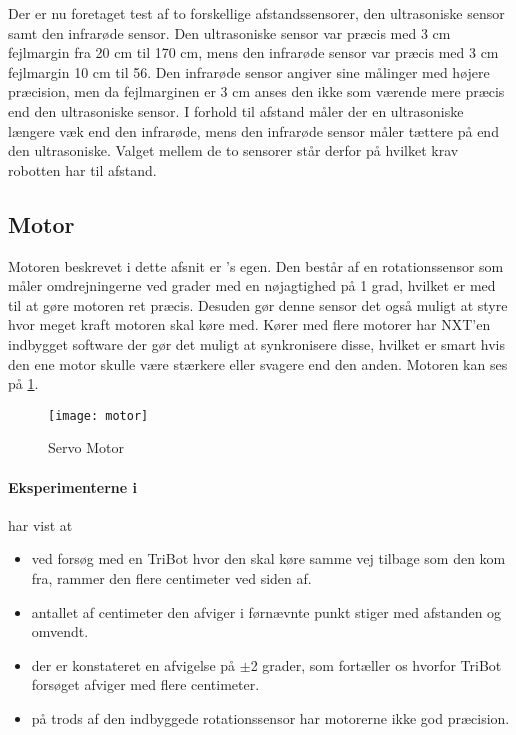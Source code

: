 Der er nu foretaget test af to forskellige afstandssensorer, den ultrasoniske sensor samt den infrarøde sensor. 
Den ultrasoniske sensor var præcis med 3 cm fejlmargin fra 20 cm til 170 cm, mens den infrarøde sensor var præcis med 3 cm fejlmargin 10 cm til 56.
Den infrarøde sensor angiver sine målinger med højere præcision, men da fejlmarginen er 3 cm anses den ikke som værende mere præcis end den ultrasoniske sensor.
I forhold til afstand måler der en ultrasoniske længere væk end den infrarøde, mens den infrarøde sensor måler tættere på end den ultrasoniske.
Valget mellem de to sensorer står derfor på hvilket krav robotten har til afstand.

\subsection{Motor}
Motoren beskrevet i dette afsnit er \lego's egen.
Den består af en rotationssensor som måler omdrejningerne ved grader med en nøjagtighed på 1 grad, hvilket er med til at gøre motoren ret præcis. 
Desuden gør denne sensor det også muligt at styre hvor meget kraft motoren skal køre med.
Kører med flere motorer har NXT'en indbygget software der gør det muligt at synkronisere disse, hvilket er smart hvis den ene motor skulle være stærkere eller svagere end den anden.\cite{tikNXT}
Motoren kan ses på \cref{sensor:motor_sensor}.
\\

\begin{figure}[h]
\centering
\texttt{[image: motor]} 	
\caption{\legoms Servo Motor}
\label{sensor:motor_sensor}
\end{figure}

\paragraph{Eksperimenterne i \citet{tikNXT}} har vist at
\begin{itemize}
\item ved forsøg med en TriBot hvor den skal køre samme vej tilbage som den kom fra, rammer den flere centimeter ved siden af.
\item antallet af centimeter den afviger i førnævnte punkt stiger med afstanden og omvendt. 
\item der er konstateret en afvigelse på $\pm$2 grader, som fortæller os hvorfor TriBot forsøget afviger med flere centimeter.
\item på trods af den indbyggede rotationssensor har motorerne ikke god præcision.
\end{itemize}

